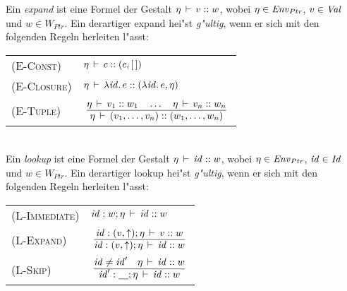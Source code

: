 \documentclass[12pt,fleqn,a4paper]{article}
\newcommand{\RN}[1]{\mbox{\textsc{(#1)}}}
\begin{document}
\begin{definition}
  Ein \emph{expand} ist eine Formel der Gestalt $\eta\,\vdash\,v\mathrel{::} w$, wobei $\eta\in{\text{\it Env\/}}_{Ptr}$, $v\in{\text{\it Val\/}}$ und
  $w\in W_{Ptr}$. Ein derartiger expand hei"st \emph{g"ultig}, wenn er sich mit den folgenden Regeln herleiten
  l"asst: \\[5mm]
  \begin{tabular}{ll}
    \RN{E-Const}   & $\eta\,\vdash\,c\mathrel{::}(c,[\,])$ \\[1mm]
    \RN{E-Closure} & $\eta\,\vdash\,\lambda {\text{\it id\/}}.\,e\mathrel{::}(\lambda {\text{\it id\/}}.\,e,\eta)$ \\[1mm]
    \RN{E-Tuple}   & $\regel{\Lj{\eta}{v_1}{w_1} \quad\ldots\quad \Lj{\eta}{v_n}{w_n}}
                            {\Lj{\eta}{(v_1,\ldots,v_n)}{(w_1,\ldots,w_n)}}$ \\[3mm]
  \end{tabular} \\[2mm]
  Ein \emph{lookup} ist eine Formel der Gestalt $\eta\,\vdash\,{\text{\it id\/}}\mathrel{::} w$, wobei $\eta\in{\text{\it Env\/}}_{Ptr}$, ${\text{\it id\/}}\in{\text{\it Id\/}}$ und
  $w \in W_{Ptr}$. Ein derartiger lookup hei"st \emph{g"ultig}, wenn er sich mit den folgenden Regeln herleiten
  l"asst: \\[5mm]
  \begin{tabular}{ll}
    \RN{L-Immediate} & ${\text{\it id\/}}:w;\eta\,\vdash\,{\text{\it id\/}}\mathrel{::} w$ \\[1mm]
    \RN{L-Expand}    & $\regel{\Lj{\id:(v,\uparrow);\eta}{v}{w}}
                              {\Lj{\id:(v,\uparrow);\eta}{\id}{w}}$ \\[3mm]
    \RN{L-Skip}      & $\regel{\id \ne \id' \quad \Lj{\eta}{\id}{w}}
                              {\Lj{\id':\underline{\quad};\eta}{\id}{w}}$ \\[3mm]
  \end{tabular}
\end{definition}
\end{document}
